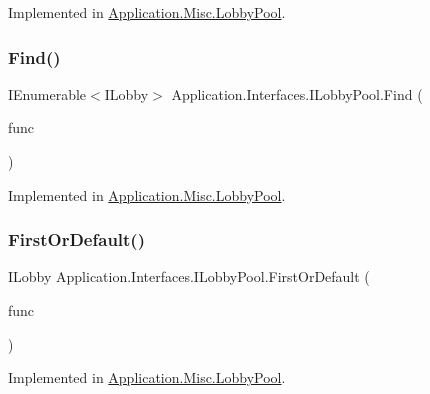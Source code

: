 Implemented in \mbox{\hyperlink{class_application_1_1_misc_1_1_lobby_pool_af9f3a5b65c1a948fa63796a907c1684d}{Application.\+Misc.\+Lobby\+Pool}}.

\mbox{\label{interface_application_1_1_interfaces_1_1_i_lobby_pool_ac64adf71b4ab967725dec520bab627c3}} 
\subsubsection{\texorpdfstring{Find()}{Find()}}
{\footnotesize\ttfamily I\+Enumerable$<$I\+Lobby$>$ Application.\+Interfaces.\+I\+Lobby\+Pool.\+Find (\begin{DoxyParamCaption}\item[{Func$<$ I\+Lobby, bool $>$}]{func }\end{DoxyParamCaption})}



Implemented in \mbox{\hyperlink{class_application_1_1_misc_1_1_lobby_pool_a3d1c9e496386713ad5d8ede307e6c28c}{Application.\+Misc.\+Lobby\+Pool}}.

\mbox{\label{interface_application_1_1_interfaces_1_1_i_lobby_pool_aa518351cc8b58ef5997f7ecef19633bb}} 
\subsubsection{\texorpdfstring{First\+Or\+Default()}{FirstOrDefault()}}
{\footnotesize\ttfamily I\+Lobby Application.\+Interfaces.\+I\+Lobby\+Pool.\+First\+Or\+Default (\begin{DoxyParamCaption}\item[{Func$<$ I\+Lobby, bool $>$}]{func }\end{DoxyParamCaption})}



Implemented in \mbox{\hyperlink{class_application_1_1_misc_1_1_lobby_pool_a5676f006bc10c46224c1b3bb266702a3}{Application.\+Misc.\+Lobby\+Pool}}.

